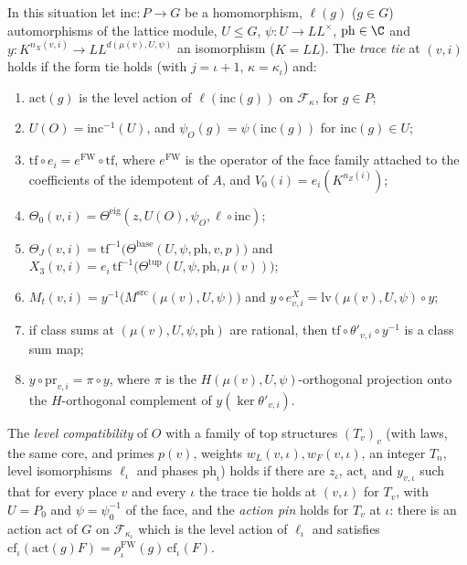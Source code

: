 \begin{definition}\label{pf:onto3:ontie}
In this situation let $\mathrm{inc}\colon P\to G$ be a homomorphism, $\ell(g)$ ($g\in G$) automorphisms of the lattice
module, $U\le G$, $\psi\colon U\to\mathit{LL}^\times$, $\mathrm{ph}\in\C$ and $y\colon K^{n_X(v,i)}\to
\mathit{LL}^{d(\mu(v),U,\psi)}$ an isomorphism ($K=\mathit{LL}$). The \emph{trace tie} at $(v,i)$ holds if the form tie
holds (with $j=\iota+1$, $\kappa=\kappa_\iota$) and:
\begin{enumerate}[label=(\roman*)]
\item $\mathrm{act}(g)$ is the level action of $\ell(\mathrm{inc}(g))$ on $\mathcal F_\kappa$, for $g\in P$;
\item $U(O)=\mathrm{inc}^{-1}(U)$, and $\psi_O(g)=\psi(\mathrm{inc}(g))$ for $\mathrm{inc}(g)\in U$;
\item $\mathrm{tf}\circ e_i=e^{\mathrm{FW}}\circ\mathrm{tf}$, where $e^{\mathrm{FW}}$ is the operator of the face
family attached to the coefficients of the idempotent of $A$, and $V_0(i)=e_i(K^{n_Z(i)})$;
\item $\Theta_0(v,i)=\Theta^{\mathrm{eig}}(z,U(O),\psi_O,\ell\circ\mathrm{inc})$;
\item $\Theta_J(v,i)=\mathrm{tf}^{-1}\bigl(\Theta^{\mathrm{base}}(U,\psi,\mathrm{ph},v,p)\bigr)$ and
$X_3(v,i)=e_i\,\mathrm{tf}^{-1}\bigl(\Theta^{\mathrm{tup}}(U,\psi,\mathrm{ph},\mu(v))\bigr)$;
\item $M_t(v,i)=y^{-1}\bigl(M^{\mathrm{src}}(\mu(v),U,\psi)\bigr)$ and $y\circ e^X_{v,i}=\mathrm{lv}(\mu(v),U,\psi)\circ
y$;
\item if class sums at $(\mu(v),U,\psi,\mathrm{ph})$ are rational, then $\mathrm{tf}\circ\theta'_{v,i}\circ y^{-1}$ is a
class sum map;
\item $y\circ\mathrm{pr}_{v,i}=\pi\circ y$, where $\pi$ is the $H(\mu(v),U,\psi)$-orthogonal projection onto the
$H$-orthogonal complement of $y(\ker\theta'_{v,i})$.
\end{enumerate}
The \emph{level compatibility} of $O$ with a family of top structures $(T_v)_v$ (with laws, the same core, and primes
$p(v)$, weights $w_L(v,\iota),w_F(v,\iota)$, an integer $T_n$, level isomorphisms $\ell_\iota$ and phases
$\mathrm{ph}_\iota$) holds if there are $z_\iota$, $\mathrm{act}_\iota$ and $y_{v,\iota}$ such that for every place $v$
and every $\iota$ the trace tie holds at $(v,\iota)$ for $T_v$, with $U=P_0$ and $\psi=\psi_0^{-1}$ of the face, and the
\emph{action pin} holds for $T_v$ at $\iota$: there is an action $\mathrm{act}$ of $G$ on $\mathcal F_{\kappa_\iota}$
which is the level action of $\ell_\iota$ and satisfies $\mathrm{cf}_\iota(\mathrm{act}(g)F)=\rho^{\mathrm{FW}}_\iota(g)
\,\mathrm{cf}_\iota(F)$.
\end{definition}


